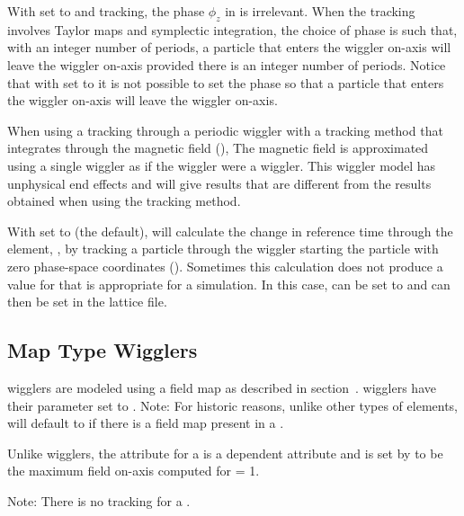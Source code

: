 {With  set to  and  tracking, the phase $\phi_z$ in
 is irrelevant. When the tracking involves Taylor maps and symplectic integration, the
choice of phase is such that, with an integer number of periods, a particle that enters the wiggler
on-axis will leave the wiggler on-axis provided there is an integer number of periods. Notice that with
 set to  it is not possible to set the phase so that a particle
that enters the wiggler on-axis will leave the wiggler on-axis. 

When using a tracking through a periodic wiggler with a tracking method that integrates through the
magnetic field (), The magnetic field is approximated using a single wiggler 
as if the wiggler were a  wiggler. This wiggler model has unphysical end effects and
will give results that are different from the results obtained when using the 
tracking method.

With  set to  (the default), \bmad will calculate the change
in reference time through the element, , by tracking a particle through the wiggler
starting the particle with zero phase-space coordinates (). Sometimes this calculation
does not produce a value for  that is appropriate for a simulation. In this case,
 can be set to  and  can then be set in
the lattice file.

\subsection{Map Type Wigglers}
\label{s:wiggler.map}

 wigglers are modeled using a field map as described in section~.
 wigglers have their  parameter set to . Note: For historic
reasons, unlike other types of elements,  will default to  if there is a
field map present in a .

Unlike  wigglers, the  attribute for a   
is a dependent attribute and is 
set by \bmad to be the maximum field on-axis computed for  = 1.

Note: There is no  tracking for a  . 

}
